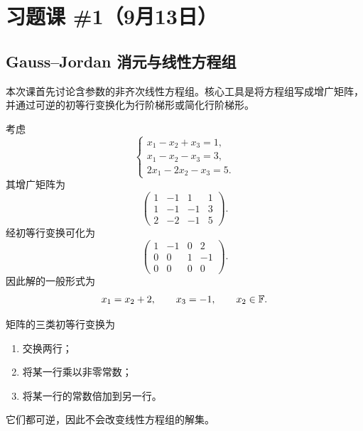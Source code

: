 \section{习题课 \#1（9月13日）}

\subsection{Gauss--Jordan 消元与线性方程组}

本次课首先讨论含参数的非齐次线性方程组。核心工具是将方程组写成增广矩阵，并通过可逆的初等行变换化为行阶梯形或简化行阶梯形。

\begin{example}
考虑
\begin{equation}
\begin{cases}
 x_1-x_2+x_3=1,\\
 x_1-x_2-x_3=3,\\
 2x_1-2x_2-x_3=5.
\end{cases}
\end{equation}
其增广矩阵为
\begin{equation}
\left(
\begin{array}{ccc|c}
1&-1&1&1\\
1&-1&-1&3\\
2&-2&-1&5
\end{array}
\right).
\end{equation}
经初等行变换可化为
\begin{equation}
\left(
\begin{array}{ccc|c}
1&-1&0&2\\
0&0&1&-1\\
0&0&0&0
\end{array}
\right).
\end{equation}
因此解的一般形式为
\begin{equation}
 x_1=x_2+2,
 \qquad x_3=-1,
 \qquad x_2\in\mathbb F.
\end{equation}
\end{example}

\begin{definition}
矩阵的三类初等行变换为
\begin{enumerate}
  \item 交换两行；
  \item 将某一行乘以非零常数；
  \item 将某一行的常数倍加到另一行。
\end{enumerate}
它们都可逆，因此不会改变线性方程组的解集。
\end{definition}

